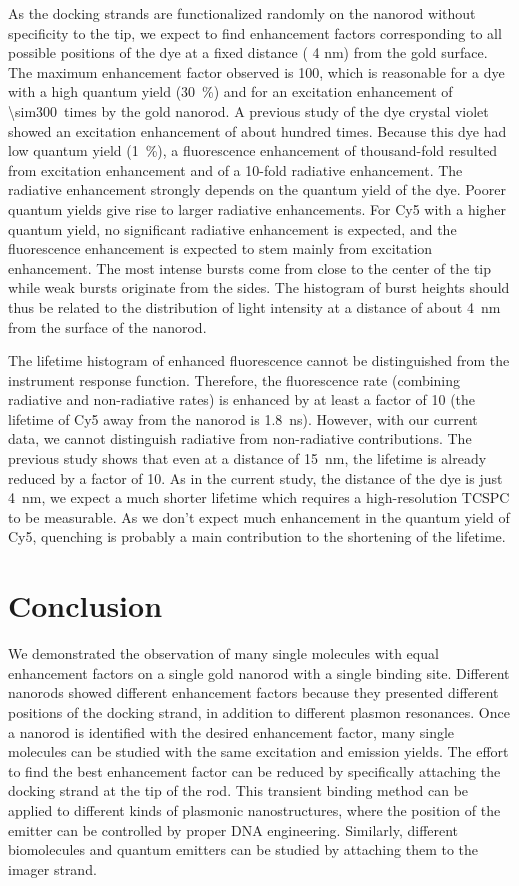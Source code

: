 As the docking strands are functionalized randomly on the nanorod without specificity to the tip, we expect to find enhancement factors corresponding to all possible positions of the dye at a fixed distance ( 4 nm) from the gold surface.
The maximum enhancement factor observed is 100, which is reasonable for a dye with a high quantum yield (\SI{30}{\percent}) and for an excitation enhancement of \SI{\sim300}{times} by the gold nanorod.
A previous study of the dye crystal violet showed an excitation enhancement of about hundred times. Because this dye had low quantum yield (\SI{1}{\percent}), a fluorescence enhancement of thousand-fold resulted from excitation enhancement and of a 10-fold radiative enhancement. The radiative enhancement strongly depends on the quantum yield of the dye. Poorer quantum yields give rise to larger radiative enhancements. For Cy5 with a higher quantum yield, no significant radiative enhancement is expected, and the fluorescence enhancement is expected to stem mainly from excitation enhancement.
The most intense bursts come from close to the center of the tip while weak bursts originate from the sides.
The histogram of burst heights should thus be related to the distribution of light intensity at a distance of about \SI{4}{\nm} from the surface of the nanorod.

The lifetime histogram of enhanced fluorescence cannot be distinguished from the instrument response function. Therefore, the fluorescence rate (combining radiative and non-radiative rates) is enhanced by at least a factor of 10 (the lifetime of Cy5 away from the nanorod is \SI{1.8}{\ns}). However, with our current data, we cannot distinguish radiative from non-radiative contributions.
The previous study\cite{seelig2007nanoparticleinduced} shows that even at a distance of \SI{15}{\nm}, the lifetime is already reduced by a factor of 10.
As in the current study, the distance of the dye is just \SI{4}{\nm}, we expect a much shorter lifetime which requires a high-resolution TCSPC to be measurable.
As we don't expect much enhancement in the quantum yield of Cy5, quenching is probably a main contribution to the shortening of the lifetime.

\section{Conclusion}
We demonstrated the observation of many single molecules with equal enhancement factors on a single gold nanorod with a single binding site.
Different nanorods showed different enhancement factors because they presented different positions of the docking strand, in addition to different plasmon resonances.
Once a nanorod is identified with the desired enhancement factor, many single molecules can be studied with the same excitation and emission yields.
The effort to find the best enhancement factor can be reduced by specifically attaching the docking strand at the tip of the rod.
This transient binding method can be applied to different kinds of plasmonic nanostructures, where the position of the emitter can be controlled by proper DNA engineering.
Similarly, different biomolecules and quantum emitters can be studied by attaching them to the imager strand.


